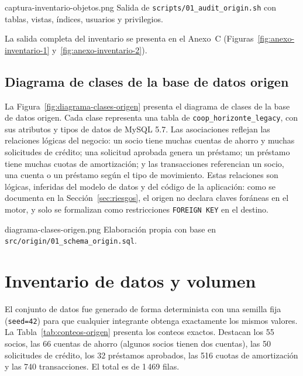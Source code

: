 %
  {captura-inventario-objetos.png}%
  {Salida de \texttt{scripts/01\_audit\_origin.sh} con tablas, vistas, índices, usuarios y privilegios.}

La salida completa del inventario se presenta en el Anexo~C
(Figuras~\ref{fig:anexo-inventario-1} y~\ref{fig:anexo-inventario-2}).

\subsection{Diagrama de clases de la base de datos origen}

La Figura~\ref{fig:diagrama-clases-origen} presenta el diagrama de clases de
la base de datos origen. Cada clase representa una tabla de
\texttt{coop\_horizonte\_legacy}, con sus atributos y tipos de datos de
MySQL 5.7. Las asociaciones reflejan las relaciones lógicas del negocio: un
socio tiene muchas cuentas de ahorro y muchas solicitudes de crédito; una
solicitud aprobada genera un préstamo; un préstamo tiene muchas cuotas de
amortización; y las transacciones referencian un socio, una cuenta o un
préstamo según el tipo de movimiento. Estas relaciones son lógicas, inferidas
del modelo de datos y del código de la aplicación: como se documenta en la
Sección~\ref{sec:riesgos}, el origen no declara claves foráneas en el motor,
y solo se formalizan como restricciones \texttt{FOREIGN KEY} en el destino.

\noindent\begin{minipage}{\linewidth}
%
  {diagrama-clases-origen.png}%
  {Elaboración propia con base en \texttt{src/origin/01\_schema\_origin.sql}.}
\end{minipage}

\section{Inventario de datos y volumen}

El conjunto de datos fue generado de forma determinista con una semilla fija
(\texttt{seed=42}) para que cualquier integrante obtenga exactamente los
mismos valores. La Tabla~\ref{tab:conteos-origen} presenta los conteos
exactos. Destacan los 55 socios, las 66 cuentas de ahorro (algunos socios
tienen dos cuentas), las 50 solicitudes de crédito, los 32 préstamos
aprobados, las 516 cuotas de amortización y las 740 transacciones. El total
es de 1\,469 filas.

